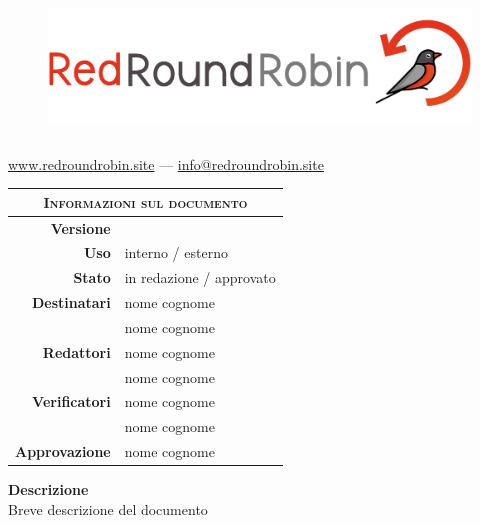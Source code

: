


\begin{figure}[t!]
    \centering
    \includegraphics[height=10em]{res/images/logo.png}
\end{figure}



\maketitle 
\thispagestyle{empty}



\vspace{-6em}

\begin{center}
    \href{https://www.redroundrobin.site}{www.redroundrobin.site} --- \href{mailto:info@redroundrobin.site}{info@redroundrobin.site}
\end{center}

\vspace{2em}


\begin{table}[ht]
  \begin{center}
    \label{tab:Informazioni_Documento}
    \begin{tabular}{r|l}
        \multicolumn{2}{c}{ \textsc{Informazioni sul documento} } \\
        \hline
    	\textbf{Versione} &  \docVersione \\
		\textbf{Uso} &  interno / esterno \\
        \textbf{Stato} & in redazione / approvato \\
		\textbf{Destinatari}  &
                            nome cognome \\&
                            nome cognome \\
		\textbf{Redattori} & 
                            nome cognome \\&
                            nome cognome \\
		\textbf{Verificatori} &  
                            nome cognome \\&
                            nome cognome \\
		\textbf{Approvazione} &  
                            nome cognome \\
    \end{tabular}
  \end{center}
\end{table}



\vspace{0em}

\begin{center}
    \textbf{Descrizione}\\
    Breve descrizione del documento
\end{center}


